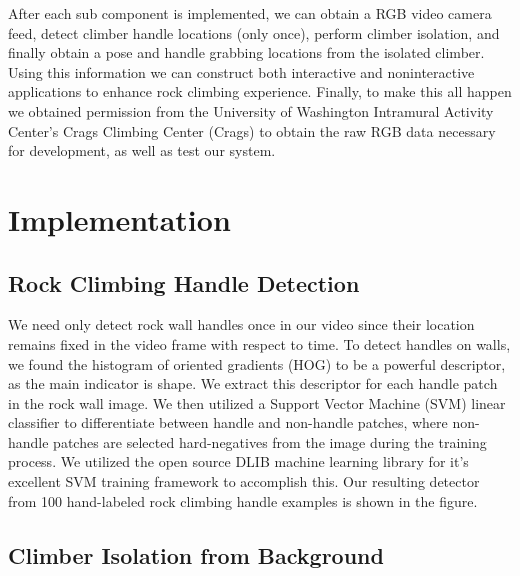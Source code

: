 \documentclass{chi2009}
\begin{document}
After each sub component is implemented, we can obtain a RGB video camera feed, detect climber handle locations (only once), perform climber isolation, and finally obtain a pose and handle grabbing locations from the isolated climber. Using this information we can construct both interactive and noninteractive applications to enhance rock climbing experience. Finally, to make this all happen we obtained permission from the University of Washington Intramural Activity Center's Crags Climbing Center (Crags) to obtain the raw RGB data necessary for development, as well as test our system.

\section{Implementation}

\subsection{Rock Climbing Handle Detection}

We need only detect rock wall handles once in our video since their location remains fixed in the video frame with respect to time. To detect handles on walls, we found the histogram of oriented gradients (HOG) to be a powerful descriptor, as the main indicator is shape. We extract this descriptor for each handle patch in the rock wall image. We then utilized a Support Vector Machine (SVM) linear classifier to differentiate between handle and non-handle patches, where non-handle patches are selected hard-negatives from the image during the training process. We utilized the open source DLIB machine learning library for it's excellent SVM training framework to accomplish this. Our resulting detector from 100 hand-labeled rock climbing handle examples is shown in the figure.

\subsection{Climber Isolation from Background}
\end{document}
